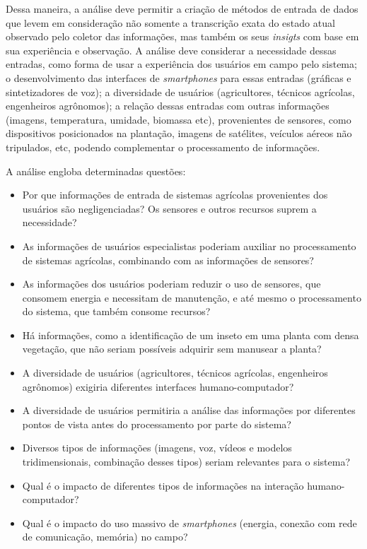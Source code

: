 \documentclass[12pt]{article}
\begin{document}
Dessa maneira, a análise deve permitir a criação de métodos de entrada de dados que levem em consideração não somente a transcrição exata do estado atual observado pelo coletor das informações, mas também os seus \textit{insigts} com base em sua experiência e observação. A análise deve considerar a necessidade dessas entradas, como forma de usar a experiência dos usuários em campo pelo sistema; o desenvolvimento das interfaces de \textit{smartphones} para essas entradas (gráficas e sintetizadores de voz); a diversidade de usuários (agricultores, técnicos agrícolas, engenheiros agrônomos); a relação dessas entradas com outras informações (imagens, temperatura, umidade, biomassa etc), provenientes de sensores, como dispositivos posicionados na plantação, imagens de satélites, veículos aéreos não tripulados, etc, podendo complementar o processamento de informações.

A análise engloba determinadas questões:
\begin{itemize}
	\item Por que informações de entrada de sistemas agrícolas provenientes dos usuários são negligenciadas? Os sensores e outros recursos suprem a necessidade?
	\item As informações de usuários especialistas poderiam auxiliar no processamento de sistemas agrícolas, combinando com as informações de sensores?
	\item As informações dos usuários poderiam reduzir o uso de sensores, que consomem energia e necessitam de manutenção, e até mesmo o processamento do sistema, que também consome recursos?
	\item Há informações, como a identificação de um inseto em uma planta com densa vegetação, que não seriam possíveis adquirir sem manusear a planta?
	\item A diversidade de usuários (agricultores, técnicos agrícolas, engenheiros agrônomos) exigiria diferentes interfaces humano-computador?
	\item A diversidade de usuários permitiria a análise das informações por diferentes pontos de vista antes do processamento por parte do sistema?
	\item Diversos tipos de informações (imagens, voz, vídeos e modelos tridimensionais, combinação desses tipos) seriam relevantes para o sistema?
	\item Qual é o impacto de diferentes tipos de informações na interação humano-computador?
	\item Qual é o impacto do uso massivo de \textit{smartphones} (energia, conexão com rede de comunicação, memória) no campo?
\end{itemize}
\end{document}
